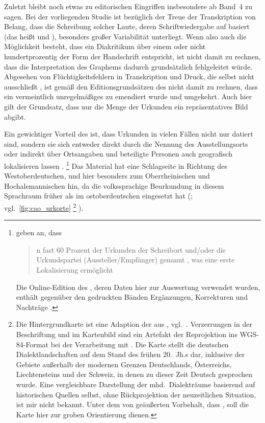 Zuletzt bleibt noch etwas zu editorischen Eingriffen insbesondere ab
Band~4\nocite{cao4} zu sagen.
Bei der vorliegenden Studie ist bezüglich der Treue der Transkription von
Belang, dass die Schreibung solcher Laute, deren Schriftwiedergabe auf 
basiert (das heißt %
 und %
), besonders großer Variabilität unterliegt. Wenn also auch die Möglichkeit
besteht, dass ein Diakritikum über einem  oder  nicht
hundertprozentig der Form der Handschrift entspricht, ist nicht damit zu
rechnen, dass die Interpretation des Graphems dadurch grundsätzlich
fehlgeleitet würde. Abgesehen von %
Flüchtigkeitsfehlern in Transkription und Druck, die selbst
\citeauthor{wilhelm1932} nicht ausschließt \autocites[\RN{60},
\RN{78}]{wilhelm1932}, ist gemäß den Editionsgrundsätzen des \CAO{}
nicht damit zu rechnen, dass ein vermeintlich unregelmäßiges  zu
 emendiert wurde und umgekehrt. Auch hier gilt der Grundsatz, dass nur
die Menge der Urkunden ein repräsentatives Bild abgibt.

Ein gewichtiger Vorteil des \CAO{} ist, dass Urkunden in vielen Fällen
nicht nur datiert sind, sondern sie sich entweder direkt durch die Nennung des
Ausstellungsorts oder indirekt über Ortsangaben und beteiligte Personen auch
geografisch lokalisieren lassen \autocite[16]{schulze2011}.%
%
	\footnote{\citet[393]{gniffkerapp2005} geben an, dass
	\blockquote{n fast 60 Prozent der Urkunden \textelp{} der
	Schreibort und/oder die Urkundspartei (Aussteller/Empfänger) genannt
	, was eine erste Lokalisierung ermöglicht}. Die
	Online-Edition des \CAO{}, deren Daten hier zur Auswertung
	verwendet wurden, enthält gegenüber den gedruckten Bänden Ergänzungen,
	Korrekturen und Nachträge \autocite[vgl.][393--394]{gniffkerapp2005}.}
%
Das Material hat eine Schlagseite in Richtung des Westoberdeutschen, und hier
besonders zum Oberrheinischen und Hochalemannischen hin, da die volkssprachige
Beurkundung in diesem Sprachraum früher als im ostoberdeutschen eingesetzt
hat (\cites[1774]{skala1985}[15]{schulze2011}; vgl.~\cref{fig:cao_urkorte}%
%
	\footnote{Die Hintergrundkarte ist eine Adaption der
		 aus \citet{wiesinger1983},
		vgl.~\citet{wiesinger1983:rede}. Verzerrungen in der Beschriftung und
		im Kartenbild sind ein Artefakt der Reprojektion ins WGS-84-Format bei
		der Verarbeitung mit . Die Karte stellt die deutschen
		Dialektlandschaften auf dem Stand des frühen 20.~Jh.s dar, inklusive
		der Gebiete außerhalb der modernen Grenzen Deutschlands, Österreichs,
		Liechtensteins und der Schweiz, in denen zu dieser Zeit Deutsch
		gesprochen wurde. Eine vergleichbare Darstellung der mhd.~Dialekträume
		basierend auf historischen Quellen selbst, ohne Rückprojektion der
		neuzeitlichen Situation, ist mir nicht bekannt. Unter dem von
		\citet[4]{paul2007} geäußerten Vorbehalt, dass , soll die Karte hier zur
		groben Orientierung dienen. }%
%
).

